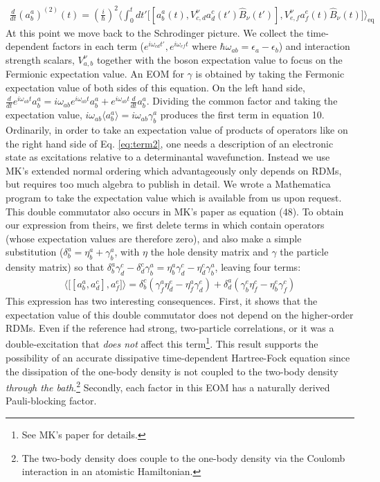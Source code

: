 \documentclass[aip,jcp,preprint,floatfix]{revtex4-1}
\begin{document}
{\begin{align}
 \frac{d}{dt} (a^{a}_b)^{(2)}(t)  = (\frac{i}{\hbar})^2 \big\langle \int_{0}^t dt'\big [[a^{a}_b(t),V^\nu_{c,d}a^c_d(t')\hat{B}_\nu(t')],V^\nu_{e,f} a^{e}_f(t) \hat{B}_\nu(t)] \big\rangle_\text{eq}
 \label{eq:term2}
\end{align}
At this point we move back to the Schrodinger picture. We collect the time-dependent factors in each term ($e^{i\omega_{cd}t'}, e^{i\omega_{ef}t}$ where $\hbar \omega_{ab}=\epsilon_a-\epsilon_b$) and interaction strength scalars, $V^\nu_{a,b}$ together with the boson expectation value to focus on the Fermionic expectation value. An EOM for $\gamma$ is obtained by taking the Fermonic expectation value of both sides of this equation. On the left hand side, $\frac{d}{dt} e^{i\omega_{ab}t} a^a_b = i\omega_{ab}e^{i\omega_{ab}t}a^a_b + e^{i\omega_{ab}t} \frac{d}{dt} a^a_b$. Dividing the common factor and taking the expectation value, $i\omega_{ab} \langle a^a_b\rangle = i\omega_{ab}\gamma^a_b$ produces the first term in equation 10.\\
\indent Ordinarily, in order to take an expectation value of products of operators like on the right hand side of Eq. \ref{eq:term2}, one needs a description of an electronic state as excitations relative to a determinantal wavefunction. Instead we use MK's extended normal ordering which advantageously only depends on RDMs, but requires too much algebra to publish in detail. We wrote a Mathematica program to take the expectation value which is available from us upon request. This double commutator also occurs in MK's paper\cite{Kutzelnigg:1997aa} as equation (48). To obtain our expression from theirs, we first delete terms in which contain operators (whose expectation values are therefore zero), and also make a simple substitution ($\delta^a_b = \eta^a_b+\gamma^a_b$, with $\eta$ the hole density matrix and $\gamma$ the particle density matrix) so that $\delta^a_b \gamma^c_d - \delta^c_d \gamma^a_b = \eta^a_b\gamma^c_d - \eta^c_d\gamma^a_b$, leaving four terms:
\begin{align}
 \big\langle \big[[a^a_b,a^c_d],a^e_f\big] \big\rangle = \delta^c_b(\gamma^a_f\eta^e_d-\eta^a_f\gamma^e_d)+\delta^a_d(\gamma^e_b\eta^c_f-\eta^e_b\gamma^c_f)
\end{align}
This expression has two interesting consequences. First, it shows that the expectation value of this double commutator does not depend on the higher-order RDMs. Even if the reference had strong, two-particle correlations, or it was a double-excitation that \emph{does not} affect this term\footnote{See MK's paper for details.}. This result supports the possibility of an accurate dissipative time-dependent Hartree-Fock equation since the dissipation of the one-body density is not coupled to the two-body density \emph{through the bath}.\footnote{The two-body density does couple to the one-body density via the Coulomb interaction in an atomistic Hamiltonian.} Secondly, each factor in this EOM has a naturally derived Pauli-blocking factor.\\
}
\end{document}
